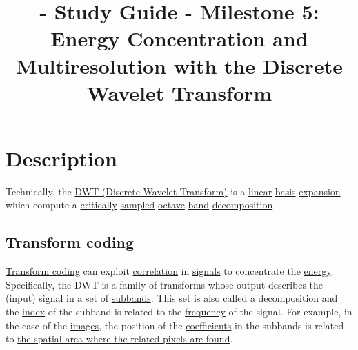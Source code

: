 
\title{\SM{} - Study Guide - Milestone 5: Energy Concentration and Multiresolution with the Discrete Wavelet Transform}

\maketitle

\section{Description}

Technically, the
\href{https://en.wikipedia.org/wiki/Discrete_wavelet_transform}{DWT
  (Discrete Wavelet Transform)} is a
\href{https://en.wikipedia.org/wiki/Linearity}{linear}
\href{https://en.wikipedia.org/wiki/Change_of_basis}{basis}
\href{https://www.youtube.com/watch?v=P2LTAUO1TdA}{expansion} which
compute a
\href{https://www.dsprelated.com/freebooks/sasp/Critically_Sampled_Perfect_Reconstruction.html}{critically}-\href{https://en.wikipedia.org/wiki/Nyquist-Shannon_sampling_theorem}{sampled}
\href{https://en.wikipedia.org/wiki/Octave_(electronics)}{octave}-\href{https://en.wikipedia.org/wiki/Frequency_band}{band}
\href{https://www.sciencedirect.com/topics/engineering/wavelet-decomposition}{decomposition}~\cite{vetterli2014foundations,kovacevic2013fourier}.

\subsection{Transform coding}

\href{https://web.stanford.edu/class/ee398a/handouts/lectures/07-TransformCoding.pdf}{Transform
  coding} can exploit
\href{https://en.wikipedia.org/wiki/Correlation_and_dependence}{correlation}
in \href{https://en.wikipedia.org/wiki/Signal}{signals} to concentrate
the
\href{https://en.wikipedia.org/wiki/Energy_(signal_processing)}{energy}. Specifically,
the DWT is a family of transforms whose output describes the (input)
signal in a set of
\href{https://en.wikipedia.org/wiki/Sub-band_coding}{subbands}. This
set is also called a decomposition and the
\href{https://en.wikipedia.org/wiki/Array_data_structure#Element_identifier_and_addressing_formulas}{index}
of the subband is related to the
\href{https://en.wikipedia.org/wiki/Frequency}{frequency} of the
signal. For example, in the case of the
\href{https://en.wikipedia.org/wiki/Digital_image}{images}, the
position of the
\href{https://en.wikipedia.org/wiki/Coefficient}{coefficients} in the
subbands is related to
\href{https://en.wikipedia.org/wiki/Discrete_wavelet_transform#/media/File:Jpeg2000_2-level_wavelet_transform-lichtenstein.png}{the
  spatial area where the related pixels are found}.


